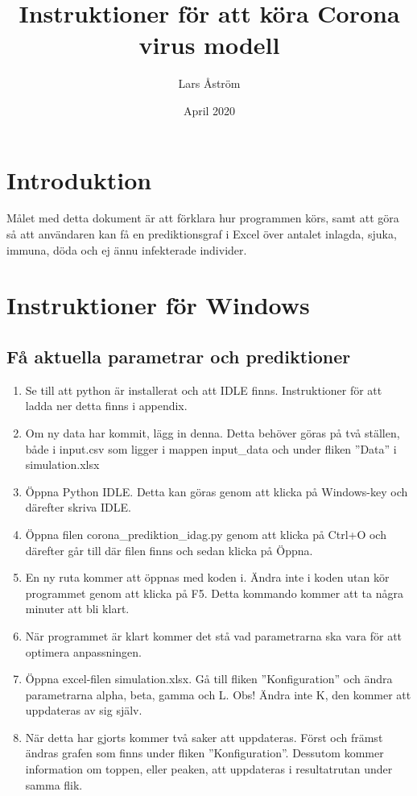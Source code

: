 \documentclass[a4paper, 12pt]{article}
\title{Instruktioner för att köra Corona virus modell}
\author{Lars Åström}
\date{April 2020} %
\theoremstyle{definition}
\begin{document}
\maketitle
\section{Introduktion}
Målet med detta dokument är att förklara hur programmen körs, samt att göra så att användaren kan få en prediktionsgraf i Excel över antalet inlagda, sjuka, immuna, döda och ej ännu infekterade individer.

\section{Instruktioner för Windows}
\subsection{Få aktuella parametrar och prediktioner}
\begin{enumerate}
  \item Se till att python är installerat och att IDLE finns. Instruktioner för att ladda ner detta finns i appendix.
  \item Om ny data har kommit, lägg in denna. Detta behöver göras på två ställen, både i input.csv som ligger i mappen input\_data och under fliken ''Data'' i simulation.xlsx
  \item Öppna Python IDLE. Detta kan göras genom att klicka på Windows-key och därefter skriva IDLE.
  \item Öppna filen corona\_prediktion\_idag.py genom att klicka på Ctrl+O och därefter går till där filen finns och sedan klicka på Öppna.
  \item En ny ruta kommer att öppnas med koden i. Ändra inte i koden utan kör programmet genom att klicka på F5. Detta kommando kommer att ta några minuter att bli klart.
  \item När programmet är klart kommer det stå vad parametrarna ska vara för att optimera anpassningen.
  \item Öppna excel-filen simulation.xlsx. Gå till fliken ''Konfiguration'' och ändra parametrarna alpha, beta, gamma och L. Obs! Ändra inte K, den kommer att uppdateras av sig själv.
  \item När detta har gjorts kommer två saker att uppdateras. Först och främst ändras grafen som finns under fliken ''Konfiguration''. Dessutom kommer information om toppen, eller peaken, att uppdateras i resultatrutan under samma flik.
\end{enumerate}
\end{document}
